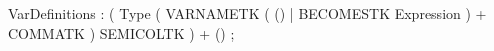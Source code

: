 %
%
%
\begin{rail}
VarDefinitions : ( Type
                   ( VARNAMETK
                     ( () | BECOMESTK Expression ) + COMMATK
                   )
                   SEMICOLTK
                 ) + () ;
\end{rail}
